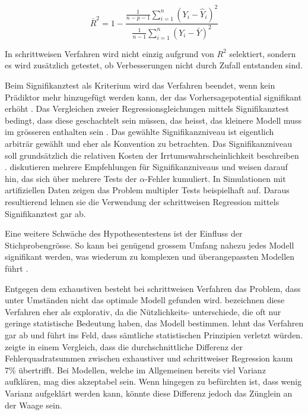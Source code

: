 \begin{equation}
\bar R^2=1-\frac{\displaystyle \frac{1}{n-p-1} \sum_{i=1}^n (Y_i-\hat{Y}_i)^2}{\displaystyle \frac{1}{n-1} \sum_{i=1}^n (Y_i-\bar{Y})^2}
\tag{korrigiertes Bestimmtheitsmass}
\end{equation}

In schrittweisen Verfahren wird nicht einzig aufgrund von $R^2$ selektiert, sondern es wird zusätzlich getestet, ob Verbesserungen nicht durch Zufall entstanden sind. 

Beim Signifikanztest als Kriterium wird das Verfahren beendet, wenn kein Prädiktor mehr hinzugefügt werden kann, der das Vorhersagepotential signifikant erhöht \cite[p.48]{bendel1977comparison}. 
Das Vergleichen zweier Regressionsgleichungen mittels Signifikanztest bedingt, dass diese geschachtelt sein müssen, das heisst, das kleinere Modell muss im grösseren enthalten sein \cite[p. 508]{jacob2003applied}.
Das gewählte Signifikanzniveau ist eigentlich arbiträr gewählt und eher als Konvention zu betrachten. Das Signifikanzniveau soll grundsätzlich die relativen Kosten der Irrtumswahrscheinlichkeit beschreiben \cite[p. 196]{hansen1999discussion}.  diskutieren mehrere Empfehlungen für Signifikanzniveaus und weisen darauf hin, das sich über mehrere Tests der $\alpha$-Fehler kumuliert. 
In  Simulationen mit artifiziellen Daten zeigen  das  Problem multipler Tests beispielhaft auf. 
Daraus resultierend lehnen sie die Verwendung der schrittweisen Regression mittels Signifikanztest gar ab.

Eine weitere Schwäche des Hypothesentestens ist der Einfluss der Stichprobengrösse. So kann bei genügend grossem Umfang nahezu jedes Modell  signifikant werden, was wiederum zu komplexen und überangepassten Modellen führt \cite[p.173]{weakliem2004introduction}.

Entgegen dem exhaustiven besteht bei schrittweisen Verfahren das Problem, dass unter Umständen nicht das optimale Modell gefunden wird. 
 bezeichnen diese Verfahren eher als explorativ, da die Nützlichkeits- unterschiede, die oft nur geringe statistische Bedeutung haben, das Modell bestimmen.
 lehnt das Verfahren gar ab und führt ins Feld, dass sämtliche statistischen Prinzipien verletzt würden. 
 zeigte in einem Vergleich, dass die durchschnittliche Differenz der Fehlerquadratsummen zwischen exhaustiver und schrittweiser Regression kaum 7\% übertrifft. Bei Modellen, welche im Allgemeinen bereits viel Varianz aufklären, mag dies akzeptabel sein. Wenn hingegen zu befürchten ist, dass wenig Varianz aufgeklärt werden kann, könnte diese Differenz jedoch das Zünglein an der Waage sein.